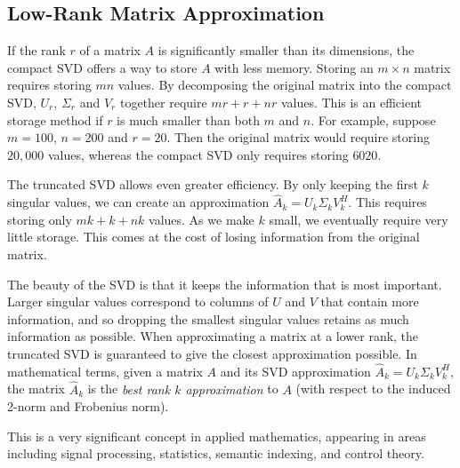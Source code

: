 \subsection*{Low-Rank Matrix Approximation}
If the rank $r$ of a matrix $A$ is significantly smaller than its dimensions, the compact SVD offers a way to store $A$ with less memory.
Storing an $m\times n$ matrix requires storing $mn$ values.
By decomposing the original matrix into the compact SVD, $U_r$, $\Sigma_r$ and $V_r$ together require $mr+r+nr$ values.
This is an efficient storage method if $r$ is much smaller than both $m$ and $n$.
For example, suppose $m=100$, $n=200$ and $r=20$.
Then the original matrix would require storing $20,000$ values, whereas the compact SVD only requires storing $6020$.

The truncated SVD allows even greater efficiency.
By only keeping the first $k$ singular values, we can create an approximation $\widehat A_k = U_k\Sigma_k V_k^H$.
This requires storing only $mk+k+nk$ values.
As we make $k$ small, we eventually require very little storage. This comes at the cost of losing information from the original matrix.

The beauty of the SVD is that it keeps the information that is most important. 
Larger singular values correspond to columns of $U$ and $V$ that contain more information, and so dropping the smallest singular values retains as much information as possible.
When approximating a matrix at a lower rank, the truncated SVD is guaranteed to give the closest approximation possible.
In mathematical terms, given a matrix $A$ and its SVD approximation $\widehat A_k = U_k\Sigma_k V_k^H$, the matrix $\widehat A_k$ is the \emph{best rank $k$ approximation} to $A$ (with respect to the induced 2-norm and Frobenius norm).

This is a very significant concept in applied mathematics, appearing in areas including signal processing, statistics, semantic indexing, and control theory.

